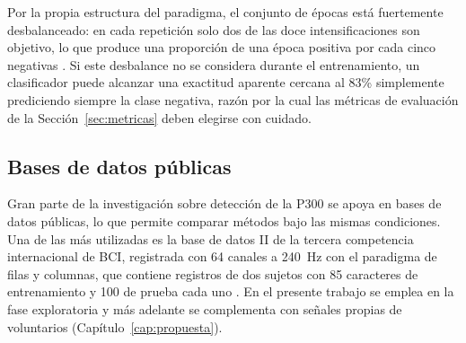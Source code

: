Por la propia estructura del paradigma, el conjunto de épocas está fuertemente
desbalanceado: en cada repetición solo dos de las doce intensificaciones son objetivo, lo que
produce una proporción de una época positiva por cada cinco negativas \cite{cecotti2011}. Si este
desbalance no se considera durante el entrenamiento, un clasificador puede alcanzar una exactitud
aparente cercana al 83\% simplemente prediciendo siempre la clase negativa, razón por la cual las
métricas de evaluación de la Sección~\ref{sec:metricas} deben elegirse con cuidado.

\subsection{Bases de datos públicas}

Gran parte de la investigación sobre detección de la P300 se apoya en bases de datos públicas, lo
que permite comparar métodos bajo las mismas condiciones. Una de las más utilizadas es la base de
datos II de la tercera competencia internacional de BCI, registrada con 64 canales a 240~Hz con el
paradigma de filas y columnas, que contiene registros de dos sujetos con 85 caracteres de
entrenamiento y 100 de prueba cada uno \cite{blankertz2006}. En el presente trabajo se emplea en la
fase exploratoria y más adelante se complementa con señales propias de voluntarios
(Capítulo~\ref{cap:propuesta}).
